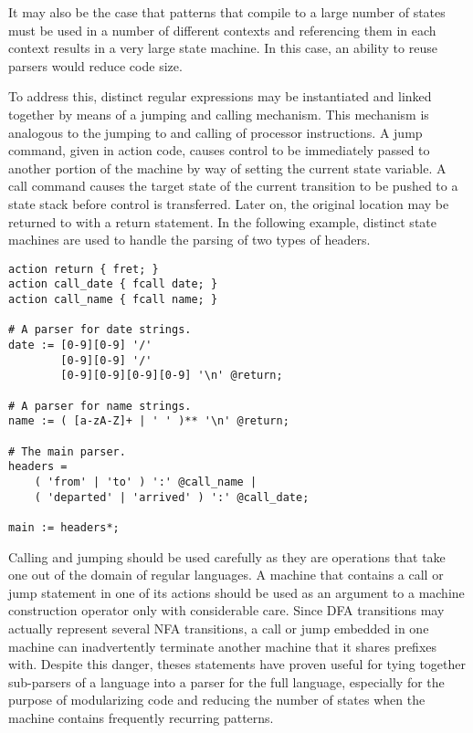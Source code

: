 \documentclass[letterpaper,11pt,oneside]{book}
\newenvironment{inline_code}{\def\baselinestretch{1}\vspace{12pt}\small}{}
\begin{document}
It may also be the case that patterns that compile to a large number of states
must be used in a number of different contexts and referencing them in each
context results in a very large state machine. In this case, an ability to reuse
parsers would reduce code size.

To address this, distinct regular expressions may be instantiated and linked
together by means of a jumping and calling mechanism. This mechanism is
analogous to the jumping to and calling of processor instructions. A jump
command, given in action code, causes control to be immediately passed to
another portion of the machine by way of setting the current state variable. A
call command causes the target state of the current transition to be pushed to
a state stack before control is transferred.  Later on, the original location
may be returned to with a return statement. In the following example, distinct
state machines are used to handle the parsing of two types of headers.

\begin{inline_code}
\begin{verbatim}
action return { fret; }
action call_date { fcall date; }
action call_name { fcall name; }

# A parser for date strings.
date := [0-9][0-9] '/' 
        [0-9][0-9] '/' 
        [0-9][0-9][0-9][0-9] '\n' @return;

# A parser for name strings.
name := ( [a-zA-Z]+ | ' ' )** '\n' @return;

# The main parser.
headers = 
    ( 'from' | 'to' ) ':' @call_name | 
    ( 'departed' | 'arrived' ) ':' @call_date;

main := headers*;
\end{verbatim}
\end{inline_code}

Calling and jumping should be used carefully as they are operations that take
one out of the domain of regular languages. A machine that contains a call or
jump statement in one of its actions should be used as an argument to a machine
construction operator only with considerable care. Since DFA transitions may
actually represent several NFA transitions, a call or jump embedded in one
machine can inadvertently terminate another machine that it shares prefixes
with. Despite this danger, theses statements have proven useful for tying
together sub-parsers of a language into a parser for the full language,
especially for the purpose of modularizing code and reducing the number of
states when the machine contains frequently recurring patterns.
\end{document}
